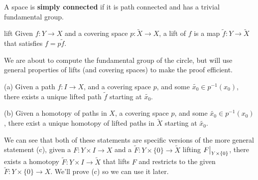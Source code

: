 \documentclass[10pt]{article}
\newcommand\restr[2]{{%
  \left.\kern-\nulldelimiterspace %
  #1 %
  \vphantom{\big|} %
  \right|_{#2} %
}}
\begin{document}
\begin{definition}
	A space is \textbf{simply connected} if it is path connected and has a trivial fundamental group.
\end{definition}

\begin{definition}{lift}
	Given $f: Y \to X$ and a covering space $p: \tilde{X} \to X$, a lift of $f$ is a map $\tilde{f}: Y \to \tilde{X}$ that
	satisfies $f = p\tilde{f}$.
\end{definition}

We are about to compute the fundamental group of the circle, but will use
general properties of lifts (and covering spaces) to make the proof efficient.

(a) Given a path $f: I \to X$, and a covering space 
$p$, and some $\tilde{x_0} \in p^{-1}(x_0)$, there
exists a unique lifted path $\tilde{f}$ starting at $\tilde{x_0}$.

(b) Given a homotopy of paths in $X$, a covering space $p$, and some
$\tilde{x_0} \in p^{-1}(x_0)$, there exist a unique homotopy of lifted paths in
$\tilde{X}$ starting at $\tilde{x_0}$.

We can see that both of these statements are specific versions of the more
general statement (c), given a $F:Y \times I \to X$ and a $\tilde{F}: Y \times
\{ 0 \} \to \tilde{X}$ lifting $\restr{F}{Y \times \{ 0\}}$, there exists a homotopy
$\tilde{F}: Y \times I \to \tilde{X}$ that lifts $F$ and restricts to the given $\tilde{F}: Y \times \{ 0 \} \to
X$. We'll prove (c) so we can use it later.
\end{document}
